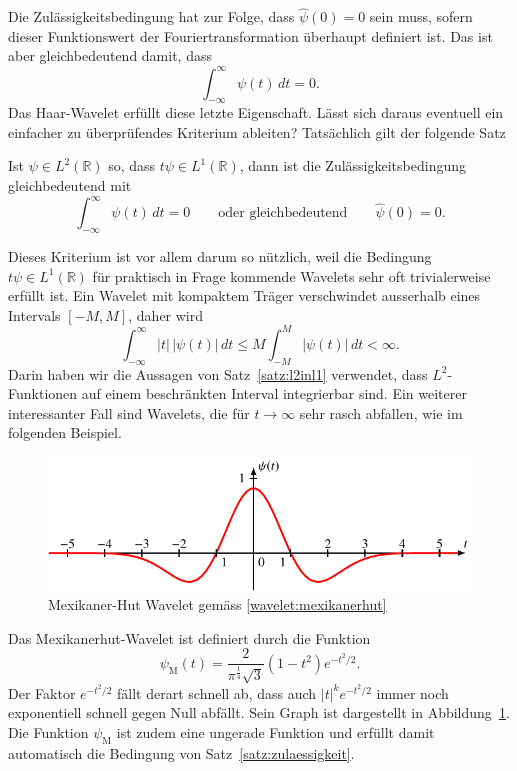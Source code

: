 Die Zulässigkeitsbedingung hat zur Folge, dass $\hat{\psi}(0)=0$ sein muss,
sofern dieser Funktionswert der Fouriertransformation überhaupt
definiert ist.
Das ist aber gleichbedeutend damit, dass 
\[
\int_{-\infty}^\infty \psi(t)\,dt = 0.
\]
Das Haar-Wavelet erfüllt diese letzte Eigenschaft.
Lässt sich daraus eventuell ein einfacher zu überprüfendes Kriterium
ableiten?
Tatsächlich gilt der folgende Satz

\begin{satz}
\label{satz:zulaessigkeit}
Ist $\psi \in L^2(\mathbb R)$ so, dass $t\psi\in L^1(\mathbb R)$, dann
ist die Zulässigkeitsbedingung gleichbedeutend mit
\[
\int_{-\infty}^\infty \psi(t)\,dt = 0
\qquad\text{oder gleichbedeutend}\qquad
\hat{\psi}(0)=0.
\]
\end{satz}


Dieses Kriterium ist vor allem darum so nützlich, weil die Bedingung
$t\psi\in L^1(\mathbb R)$ für praktisch in Frage kommende Wavelets sehr
oft trivialerweise erfüllt ist.
Ein Wavelet mit kompaktem Träger verschwindet ausserhalb eines Intervals
$[-M,M]$, daher wird 
\[
\int_{-\infty}^\infty |t|\,|\psi(t)|\,dt
\le 
M \int_{-M}^M |\psi(t)|\,dt < \infty.
\]
Darin haben wir die Aussagen von Satz~\ref{satz:l2inl1} verwendet,
dass $L^2$-Funktionen auf einem beschränkten Interval integrierbar sind.
Ein weiterer interessanter Fall sind Wavelets, die für $t\to\infty$
sehr rasch abfallen, wie im folgenden Beispiel.

\begin{beispiel}
\begin{figure}
\centering
\includegraphics{chapters/4-cwt/images/mexican.pdf}
\caption{Mexikaner-Hut Wavelet gemäss
\eqref{wavelet:mexikanerhut}
\label{wavelet:mexikanerhut:graph}}
\end{figure}
Das Mexikanerhut-Wavelet ist definiert durch die Funktion
\begin{equation}
\psi_{\text{M}}(t) = \frac{2}{\pi^{\frac14}\sqrt{3}}(1-t^2) e^{-t^2/2}.
\label{wavelet:mexikanerhut}
\end{equation}
Der Faktor $e^{-t^2/2}$ fällt derart schnell ab, dass auch $|t|^k e^{-t^2/2}$
immer noch exponentiell schnell gegen Null abfällt.
Sein Graph ist dargestellt in Abbildung~\ref{wavelet:mexikanerhut:graph}.
Die Funktion $\psi_{\text{M}}$ ist zudem eine ungerade Funktion und %
erfüllt damit automatisch die Bedingung von Satz~\ref{satz:zulaessigkeit}.
\end{beispiel}

